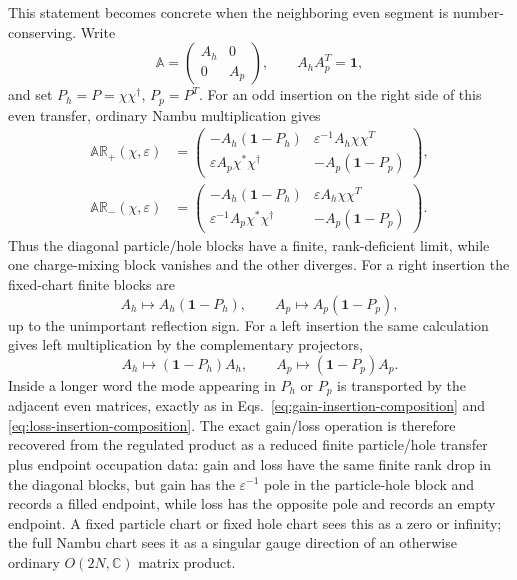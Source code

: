 \documentclass[aps,prb,onecolumn,nofootinbib,superscriptaddress]{revtex4-2}
\newcommand{\I}{\mathbf{1}}
\theoremstyle{plain}
\theoremstyle{definition}
\begin{document}
This statement becomes concrete when the neighboring even segment is
number-conserving.  Write
\begin{equation}
  \mathbb A=
  \begin{pmatrix}
    A_h&0\\
    0&A_p
  \end{pmatrix},
  \qquad
  A_hA_p^T=\I,
  \label{eq:nambu-number-conserving-even-block}
\end{equation}
and set \(P_h=P=\chi\chi^\dagger\), \(P_p=P^T\).  For an odd insertion on
the right side of this even transfer, ordinary Nambu multiplication gives
\begin{align}
  \mathbb A\mathbb R_+(\chi,\varepsilon)
  &=
  \begin{pmatrix}
    -A_h(\I-P_h) & \varepsilon^{-1}A_h\chi\chi^T\\
    \varepsilon A_p\chi^*\chi^\dagger & -A_p(\I-P_p)
  \end{pmatrix},
  \label{eq:even-times-regulated-gain-blocks}\\
  \mathbb A\mathbb R_-(\chi,\varepsilon)
  &=
  \begin{pmatrix}
    -A_h(\I-P_h) & \varepsilon A_h\chi\chi^T\\
    \varepsilon^{-1}A_p\chi^*\chi^\dagger & -A_p(\I-P_p)
  \end{pmatrix}.
  \label{eq:even-times-regulated-loss-blocks}
\end{align}
Thus the diagonal particle/hole blocks have a finite, rank-deficient limit,
while one charge-mixing block vanishes and the other diverges.  For a right
insertion the fixed-chart finite blocks are
\begin{equation}
  A_h\mapsto A_h(\I-P_h),
  \qquad
  A_p\mapsto A_p(\I-P_p),
  \label{eq:right-insertion-fixed-chart-limit}
\end{equation}
up to the unimportant reflection sign.  For a left insertion the same
calculation gives left multiplication by the complementary projectors,
\begin{equation}
  A_h\mapsto(\I-P_h)A_h,
  \qquad
  A_p\mapsto(\I-P_p)A_p .
  \label{eq:left-insertion-fixed-chart-limit}
\end{equation}
Inside a longer word the mode appearing in \(P_h\) or \(P_p\) is transported
by the adjacent even matrices, exactly as in
Eqs.~\eqref{eq:gain-insertion-composition} and
\eqref{eq:loss-insertion-composition}.  The exact gain/loss operation is
therefore recovered from the regulated product as a reduced finite
particle/hole transfer plus endpoint occupation data: gain and loss have the
same finite rank drop in the diagonal blocks, but gain has the
\(\varepsilon^{-1}\) pole in the particle-hole block and records a filled
endpoint, while loss has the opposite pole and records an empty endpoint.  A
fixed particle chart or fixed hole chart sees this as a zero or infinity; the
full Nambu chart sees it as a singular gauge direction of an otherwise
ordinary \(O(2N,\mathbb C)\) matrix product.
\end{document}
